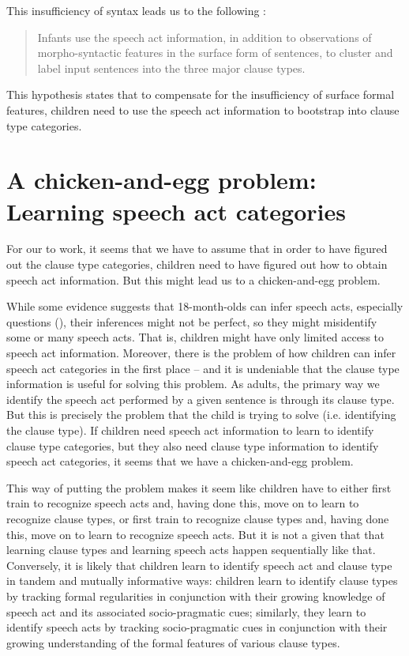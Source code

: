 This insufficiency of syntax leads us to the following \tbf{\subhypos{}}:
\begin{quote}
Infants use the speech act information, in addition to observations of morpho-syntactic features in the surface form of sentences, to cluster and label input sentences into the three major clause types.
\end{quote}


This hypothesis states that to compensate for the insufficiency of surface formal features, children need to use the speech act information to bootstrap into clause type categories.



\section{A chicken-and-egg problem: Learning speech act categories}
\label{sec:intro:sp}

For our \subhypos{} to work, it seems that we have to assume that in order to have figured out the clause type categories, children need to have figured out how to obtain speech act information. But this might lead us to a chicken-and-egg problem.

While some evidence suggests that 18-month-olds can infer speech acts, especially questions (\cite{casillas2017turn, marshmallowqueen}), their inferences might not be perfect, so they might misidentify some or many speech acts. That is, children might have only limited access to speech act information. Moreover, there is the problem of how children can infer speech act categories in the first place -- and it is undeniable that the clause type information is useful for solving this problem. As adults, the primary way we identify the speech act performed by a given sentence is through its clause type. But this is precisely the problem that the child is trying to solve (i.e. identifying the clause type). If children need speech act information to learn to identify clause type categories, but they also need clause type information to identify speech act categories, it seems that we have a chicken-and-egg problem. 

This way of putting the problem makes it seem like children have to either first train to recognize speech acts and, having done this, move on to learn to recognize clause types, or first train to recognize clause types and, having done this, move on to learn to recognize speech acts. But it is not a given that 
that learning clause types and learning speech acts happen sequentially like that. Conversely, it is likely that children learn to identify speech act and clause type in tandem and mutually informative ways: children learn to identify clause types by tracking formal regularities in conjunction with their growing
knowledge of speech act and its associated socio-pragmatic cues; similarly, they learn
to identify speech acts by tracking socio-pragmatic cues in conjunction with their growing
understanding of the formal features of various clause types.


